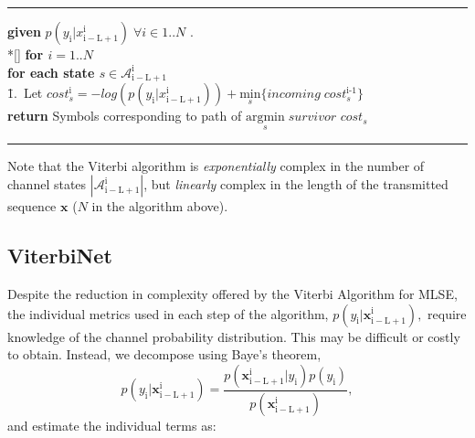 \documentclass[12pt,a4paper]{article}
\begin{document}
    \noindent\rule[10pt]{\textwidth}{0.4pt}
    {\footnotesize
    \begin{tabbing}
        {\bf given} $p(y_{\mathrm{i}}|x_{\mathrm{i-L+1}}^{\mathrm{i}}) \; \forall i \in {1..N}$ . \\*[\smallskipamount]
        {\bf for $i = 1..N $} \\
         \qquad \= {\bf for each state $s \in \mathcal{A}_{\mathrm{i-L+1}}^{\mathrm{i}}$}\\
        \qquad \qquad \= 1.\ Let $\textit{cost}_{s}^{\text{i}} = -log(p(y_{\mathrm{i}}|x_{\mathrm{i-L+1}}^{\mathrm{i}})) + \underset{s}{\text{min}} \{incoming\;\textit{cost}_{s}^{\text{i-1}}\}$ \\
        {\bf return} Symbols corresponding to path of $\underset{s}{\text{argmin}} \; \textit{survivor cost}_{s} $
    \end{tabbing}}
    \noindent\rule[10pt]{\textwidth}{0.4pt}


Note that the Viterbi algorithm is \emph{exponentially} complex in the number of channel states $|\mathcal{A}_{\mathrm{i-L+1}}^{\mathrm{i}}|$, but \emph{linearly} complex in the length of the transmitted sequence $\mathbf{x}$ ($N$ in the algorithm above). 


\subsection{ViterbiNet}
Despite the reduction in complexity offered by the Viterbi Algorithm for MLSE, the individual metrics used in each step of the algorithm,
$p(y_{\mathrm{i}}|\mathbf{x}_{\mathrm{i-L+1}}^{\mathrm{i}}),$
 require knowledge of the channel probability distribution. This may be difficult or costly to obtain. Instead, we decompose using Baye's theorem,
\begin{equation*}
p(y_{\mathrm{i}}|\mathbf{x}_{\mathrm{i-L+1}}^{\mathrm{i}}) = 
\frac
{p(\mathbf{x}_{\mathrm{i-L+1}}^{\mathrm{i}}|y_{\mathrm{i}})p(y_{\mathrm{i}})}
{p(\mathbf{x}_{\mathrm{i-L+1}}^{\mathrm{i}})},
\end{equation*}
and estimate the individual terms as:
\end{document}
